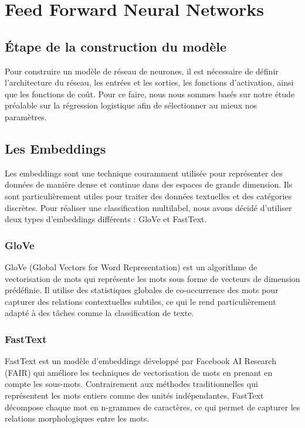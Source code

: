 \chapter{Feed Forward Neural Networks}

\section{Étape de la construction du modèle}

Pour construire un modèle de réseau de neurones, il est nécessaire de définir l'architecture du réseau, les entrées et les sorties, les fonctions d'activation, ainsi que les fonctions de coût. 
Pour ce faire, nous nous sommes basés sur notre étude préalable sur la régression logistique afin de sélectionner au mieux nos paramètres.

\section{Les Embeddings}

Les embeddings sont une technique couramment utilisée pour représenter des données de manière dense et continue dans des espaces de grande dimension. 
Ils sont particulièrement utiles pour traiter des données textuelles et des catégories discrètes.
Pour réaliser une classification multilabel, nous avons décidé d'utiliser deux types d'embeddings différents : GloVe et FastText.

\subsection{GloVe}

GloVe (Global Vectors for Word Representation) est un algorithme de vectorisation de mots qui représente les mots sous forme de vecteurs de dimension prédéfinie. 
Il utilise des statistiques globales de co-occurrence des mots pour capturer des relations contextuelles subtiles, ce qui le rend particulièrement adapté à des tâches comme la classification de texte.

\subsection{FastText}

FastText est un modèle d'embeddings développé par Facebook AI Research (FAIR) qui améliore les techniques de vectorisation de mots en prenant en compte les sous-mots. 
Contrairement aux méthodes traditionnelles qui représentent les mots entiers comme des unités indépendantes, FastText décompose chaque mot en n-grammes de caractères, ce qui permet de capturer les relations morphologiques entre les mots.



